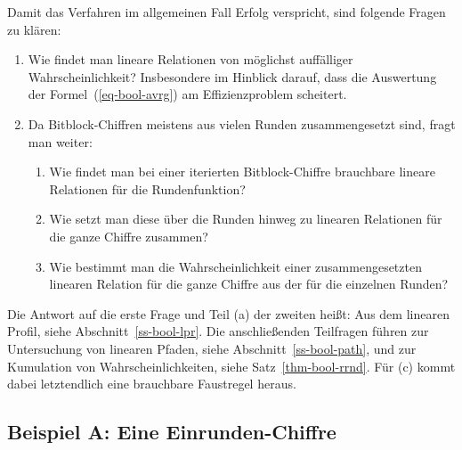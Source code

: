 \begin{refsegment}
\noindent Damit das Verfahren im allgemeinen Fall Erfolg verspricht, sind
folgende Fragen zu klären:
\begin{enumerate}
	\item Wie findet man lineare
        Relationen
        von möglichst auffälliger
        Wahrscheinlichkeit? Insbesondere im Hinblick darauf, dass die
        Auswertung der Formel~(\ref{eq-bool-avrg}) am Effizienzproblem
        scheitert.
     \item Da Bitblock-Chiffren meistens aus
        vielen Runden zusammengesetzt sind, fragt man weiter:
	\begin{enumerate}
	  \item Wie findet man bei einer iterierten Bitblock-Chiffre
	    brauchbare lineare Relationen für die Rundenfunktion?
	  \item Wie setzt man diese über die Runden hinweg zu linearen Relationen
	    für die ganze Chiffre zusammen?
	  \item Wie bestimmt man die Wahrscheinlichkeit einer zusammengesetzten
	    linearen Relation für die ganze Chiffre aus der für die einzelnen
	    Runden?
	\end{enumerate}
\end{enumerate}

\noindent Die Antwort auf die erste Frage und Teil (a) der zweiten heißt:
Aus dem linearen Profil,
siehe Abschnitt~\ref{ss-bool-lpr}. Die anschließenden
Teilfragen führen zur Untersuchung von linearen
Pfaden,
siehe Abschnitt~\ref{ss-bool-path}, und zur Kumulation von
Wahrscheinlichkeiten, siehe Satz~\ref{thm-bool-rrnd}. Für (c) kommt
dabei letztendlich eine brauchbare Faustregel heraus.

\subsection{Beispiel A: Eine Einrunden-Chiffre}\label{ss-bool-bsp1}


\end{refsegment}
